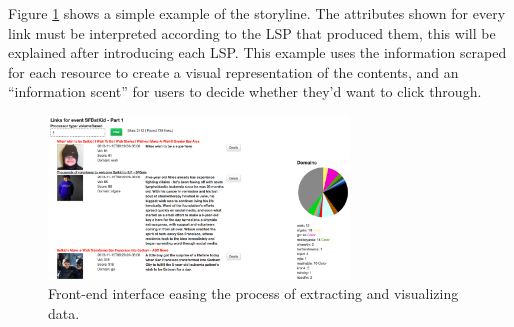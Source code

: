 \documentclass{sig-alternate}
\begin{document}
Figure \ref{fig:javascript_interface} shows a simple example of the storyline. The attributes shown for every link must be interpreted according to the LSP that produced them, this will be explained after introducing each LSP. This example uses the information scraped for each resource to create a visual representation of the contents, and an ``information scent'' for users to decide whether they'd want to click through. %
\begin{figure}[htbp]
  \centering
  \includegraphics[width=8cm]{Figures/javascript_interface.png}
  \caption{Front-end interface easing the process of extracting and visualizing data.}
  \label{fig:javascript_interface}
\end{figure}

\end{document}
